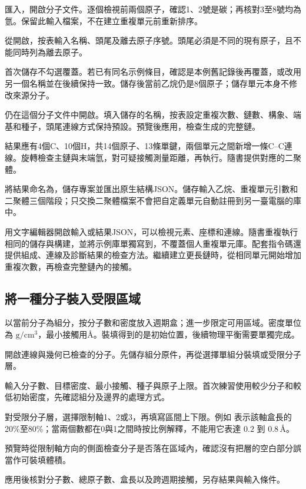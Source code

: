 \begin{steps}
  \item 匯入，開啟分子文件。逐個檢視前兩個原子，確認1、2號是碳；再核對3至8號均為氫。保留此輸入檔案，不在建立重複單元前重新排序。
  \item 從開啟，按表輸入名稱、頭尾及離去原子序號。頭尾必須是不同的現有原子，且不能同時列為離去原子。
  \item 首次儲存不勾選覆蓋。若已有同名示例條目，確認是本例舊記錄後再覆蓋，或改用另一個名稱並在後續保持一致。儲存後當前乙烷仍是8個原子；儲存單元本身不修改來源分子。
  \item 仍在這個分子文件中開啟。填入儲存的名稱，按表設定重複次數、鏈數、構象、端基和種子，頭尾連線方式保持預設。預覽後應用，檢查生成的完整鏈。
  \item 結果應有4個C、10個H，共14個原子、13條單鍵，兩個單元之間新增一條C--C連線。旋轉檢查主鏈與末端氫，對可疑接觸測量距離，再執行。隨書提供對應的二聚體。
  \item 將結果命名為，儲存專案並匯出原生結構JSON。儲存輸入乙烷、重複單元引數和二聚體三個階段；只交換二聚體檔案不會把自定義單元自動註冊到另一臺電腦的庫中。
\end{steps}

用文字編輯器開啟輸入或結果JSON，可以檢視元素、座標和連線。隨書重複執行相同的儲存與構建，並將示例庫單獨寫到，不覆蓋個人重複單元庫。配套指令碼還提供組成、連線及診斷結果的檢查方法。繼續建立更長鏈時，從相同單元開始增加重複次數，再檢查完整鏈內的接觸。

\subsection{將一種分子裝入受限區域}\label{sec:confined-packing-reference}

以當前分子為組分，按分子數和密度放入週期盒；進一步限定可用區域。密度單位為 $\mathrm{g/cm^3}$，最小接觸用\AA。裝填得到的是初始位置，後續物理平衡需要單獨完成。

\begin{steps}
  \item 開啟連線與幾何已檢查的分子。先儲存組分原件，再從選擇單組分裝填或受限分子層。
  \item 輸入分子數、目標密度、最小接觸、種子與原子上限。首次練習使用較少分子和較低初始密度，先確認組分及邊界的處理方式。
  \item 對受限分子層，選擇限制軸1、2或3，再填寫區間上下限。例如  表示該軸盒長的20\%至80\%；當兩個數都在0與1之間時按比例解釋，不能用它表達 $0.2$ 到 $0.8\,\text{\AA}$。
  \item 預覽時從限制軸方向的側面檢查分子是否落在區域內，確認沒有把層的空白部分誤當作可裝填體積。
  \item 應用後核對分子數、總原子數、盒長以及跨週期接觸，另存結果與輸入條件。
\end{steps}

